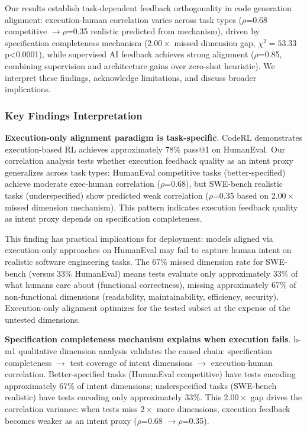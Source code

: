 
Our results establish task-dependent feedback orthogonality in code generation alignment: execution-human correlation varies across task types ($\rho$=0.68 competitive $\rightarrow \rho$=0.35 realistic predicted from mechanism), driven by specification completeness mechanism (2.$00\times$ missed dimension gap, $\chi^{2}=53.33$ p<0.0001), while supervised AI feedback achieves strong alignment ($\rho$=0.85, combining supervision and architecture gains over zero-shot heuristic). We interpret these findings, acknowledge limitations, and discuss broader implications.

\subsubsection{Key Findings Interpretation}

\textbf{Execution-only alignment paradigm is task-specific}. CodeRL \citep{le2022coderl} demonstrates execution-based RL achieves approximately 78\% pass@1 on HumanEval. Our correlation analysis tests whether execution feedback quality as an intent proxy generalizes across task types: HumanEval competitive tasks (better-specified) achieve moderate exec-human correlation ($\rho$=0.68), but SWE-bench realistic tasks (underspecified) show predicted weak correlation ($\rho$=0.35 based on 2.$00\times$ missed dimension mechanism). This pattern indicates execution feedback quality as intent proxy depends on specification completeness.

This finding has practical implications for deployment: models aligned via execution-only approaches on HumanEval may fail to capture human intent on realistic software engineering tasks. The 67\% missed dimension rate for SWE-bench (versus 33\% HumanEval) means tests evaluate only approximately 33\% of what humans care about (functional correctness), missing approximately 67\% of non-functional dimensions (readability, maintainability, efficiency, security). Execution-only alignment optimizes for the tested subset at the expense of the untested dimensions.

\textbf{Specification completeness mechanism explains when execution fails}. h-m1 qualitative dimension analysis validates the causal chain: specification completeness $\rightarrow$ test coverage of intent dimensions $\rightarrow$ execution-human correlation. Better-specified tasks (HumanEval competitive) have tests encoding approximately 67\% of intent dimensions; underspecified tasks (SWE-bench realistic) have tests encoding only approximately 33\%. This 2.$00\times$ gap drives the correlation variance: when tests miss $2\times$ more dimensions, execution feedback becomes weaker as an intent proxy ($\rho$=0.68 $\rightarrow \rho$=0.35).

